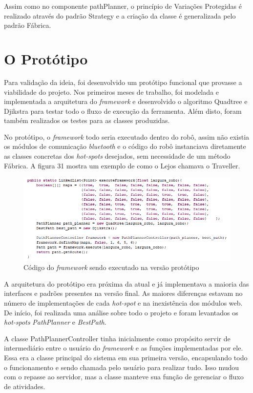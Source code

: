 Assim como no componente pathPlanner, o princípio de Variações Protegidas é realizado através do padrão Strategy e a criação da classe é generalizada pelo padrão Fábrica.

\section{O Protótipo}

Para validação da ideia, foi desenvolvido um protótipo funcional que provasse a viabilidade do projeto. Nos primeiros meses de trabalho, foi modelada e implementada a arquitetura do \textit{framework} e desenvolvido o algoritmo Quadtree e Djikstra para testar todo o fluxo de execução da ferramenta. Além disto, foram também realizados os testes para as classes produzidas.

No protótipo, o \textit{framework} todo seria executado dentro do robô, assim não existia os módulos de comunicação \textit{bluetooth} e o código do robô instanciava diretamente as classes concretas dos \textit{hot-spots} desejados, sem necessidade de um método Fábrica. A figura 31 mostra um exemplo de como o Lejos chamava o Traveller.

\begin{figure}[h]
	\centering
	\label{fig31}
		\includegraphics[keepaspectratio=true,scale=0.8]{figuras/codigoprototipo.PNG}
	\caption{Código do \textit{framework} sendo executado na versão protótipo}
\end{figure}

A arquitetura do protótipo era próxima da atual e já implementava a maioria das interfaces e padrões presentes na versão final. As maiores diferenças estavam no número de implementações de cada \textit{hot-spot} e na inexistência dos módulos web. De início, foi realizada uma análise sobre todo o projeto e foram levantados os \textit{hot-spots} \textit{PathPlanner} e \textit{BestPath}. 

A classe PathPlannerController tinha inicialmente como propósito servir de intermediário entre o usuário do \textit{framework} e as funções implementadas por ele. Essa era a classe principal do sistema em sua primeira versão, encapsulando todo o funcionamento e sendo chamada pelo usuário para realizar tudo. Isso mudou com o repasse ao servidor, mas a classe manteve sua função de gerenciar o fluxo de atividades.

